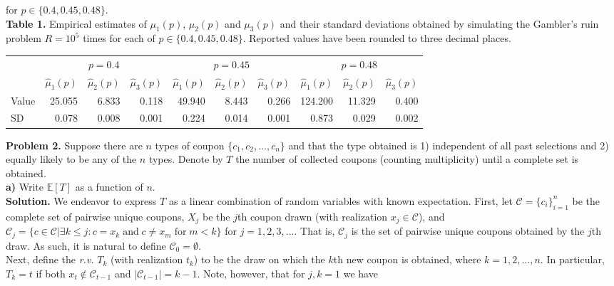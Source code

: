 \documentclass[11pt, letterpaper]{article}
\newcommand{\mbb}[1]{\mathbb{#1}}
\begin{document}
    for $p\in\{0.4, 0.45, 0.48\}$.\\[10pt] 
    {\bf Table 1.} Empirical estimates of $\mu_1(p)$, $\mu_2(p)$ and $\mu_3(p)$ and their standard deviations obtained by simulating the Gambler's ruin problem $R=10^5$ times for each of $p\in\{0.4, 0.45, 0.48\}$.
    Reported values have been rounded to three decimal places.
    \begin{center}
        \begin{tabular}{@{}l|rrrrrrrrr@{}}\toprule
                & \multicolumn{3}{c}{$p=0.4$} & \multicolumn{3}{c}{$p=0.45$} & \multicolumn{3}{c}{$p=0.48$}\\
            \cmidrule(lr){2-4}\cmidrule(lr){5-7}\cmidrule(lr){8-10}
                & $\hat{\mu}_1(p)$ & $\hat{\mu}_2(p)$ & $\hat{\mu}_3(p)$ & $\hat{\mu}_1(p)$ & $\hat{\mu}_2(p)$ & $\hat{\mu}_3(p)$ & $\hat{\mu}_1(p)$ & $\hat{\mu}_2(p)$ & $\hat{\mu}_3(p)$ \\\midrule
            Value & 25.055 & 6.833 & 0.118 & 49.940 & 8.443 & 0.266 & 124.200 & 11.329 & 0.400 \\ 
            SD & 0.078 & 0.008 & 0.001 & 0.224 & 0.014 & 0.001 & 0.873 & 0.029 & 0.002\\
            \bottomrule
        \end{tabular}
    \end{center}
    {\noindent \bf Problem 2.} Suppose there are $n$ types of coupon $\{c_1,c_2,\dots,c_n\}$ and that the type obtained is 1) independent of all past selections and 2) equally likely to be any of the $n$ types.
    Denote by $T$ the number of collected coupons (counting multiplicity) until a complete set is obtained.\\[10pt]
    {\bf a)} Write $\mbb{E}[T]$ as a function of $n$.\\[10pt]
    {\bf Solution.} We endeavor to express $T$ as a linear combination of random variables with known expectation. First, let $\mathcal{C}=\{c_i\}_{i=1}^n$ be the complete set of pairwise unique coupons, $X_j$ be the $j$th coupon drawn (with realization $x_j\in\mathcal{C}$),
    and $\mathcal{C}_j=\{c\in\mathcal{C}|\exists k\leq j:c=x_k\;\text{and}\;c\neq x_m\;\text{for}\;m<k\}$ for $j=1,2,3,\dots$. That is, $\mathcal{C}_j$ is the set of pairwise unique coupons obtained by the $j$th draw. As such, it is natural to define $\mathcal{C}_0=\emptyset$.\\[10pt]
    Next, define the {\it r.v.} $T_k$ (with realization $t_k$) to be the draw on which the $k$th new coupon is obtained, where $k=1,2,\dots,n$. In particular, $T_k=t$ if both $x_t\notin \mathcal{C}_{t-1}$ and $|\mathcal{C}_{t-1}|=k-1$. Note, however, that for $j,k=1$ we have
\end{document}
